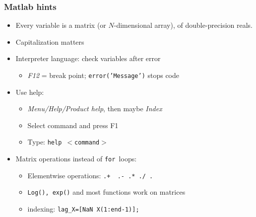 \documentclass[bigger]{beamer}
\let\TEXTsymbol\ensuremath
\begin{document}
\begin{frame}%

\frametitle{Matlab hints}

\begin{itemize}
\item Every variable is a matrix (or $N$-dimensional array),\newline
of double-precision reals.

\item Capitalization matters

\item Interpreter language: check variables after error

\begin{itemize}
\item \emph{F12} = break point; \texttt{error('Message')} stops code
\end{itemize}

\item Use help:

\begin{itemize}
\item \emph{Menu/Help/Product help}, then maybe \emph{Index}

\item Select command and press F1

\item Type: \texttt{help \TEXTsymbol{<}command\TEXTsymbol{>}}
\end{itemize}

\item Matrix operations instead of \texttt{for }loops:

\begin{itemize}
\item Elementwise operations: \texttt{.+ \ .- .* ./ .}

\item \texttt{Log(), exp()} and most functions work on matrices

\item indexing: \texttt{lag\_X=[NaN X(1:end-1)];}
\end{itemize}
\end{itemize}


\end{frame}
\end{document}
